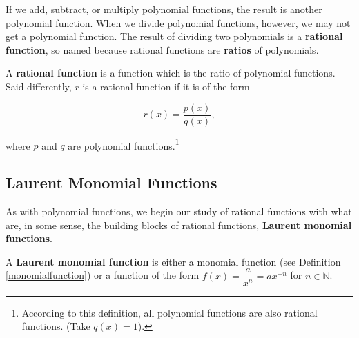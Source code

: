 
\setcounter{footnote}{0}

\label{IntroRational}


If we add, subtract, or multiply polynomial functions, the result is another polynomial function.  When we divide polynomial functions, however, we may not get a polynomial function.   The result of dividing two polynomials is a    \textbf{rational function}, so named because rational functions  are \textbf{ratios} of polynomials.

\smallskip

\colorbox{ResultColor}{\bbm

\begin{defn}  \label{rationalfunction} A \textbf{rational function} is a function which is the ratio of polynomial functions.  Said differently, $r$ is a rational function if it is of the form 

\[ r(x) = \dfrac{p(x)}{q(x)},\]

where $p$ and $q$ are polynomial functions.\footnote{According to this definition, all polynomial functions are also  rational functions. (Take $q(x) = 1$).}

\end{defn}

\ebm}

\subsection{Laurent Monomial Functions}
\label{LaurentMonomialFunctionsSection}

As with polynomial functions, we begin our study of rational functions with what are, in some sense, the building blocks of rational functions, \textbf{Laurent monomial functions}.  

\colorbox{ResultColor}{\bbm

\begin{defn}  \label{laurentmonomialfunction} A \textbf{Laurent monomial function} is either a monomial function (see Definition \ref{monomialfunction}) or a function of the form $f(x) = \dfrac{a}{x^n} = ax^{-n}$ for $n \in \mathbb{N}$.

\end{defn}

\ebm}

